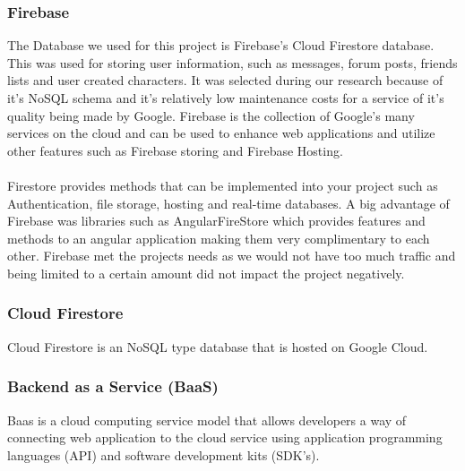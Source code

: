 \subsubsection{Firebase}
The Database we used for this project is Firebase's Cloud Firestore database. This was used for storing user information, such as messages, forum posts, friends lists and user created characters. It was selected during our research because of it's NoSQL schema and it's relatively low maintenance costs for a service of it's quality being made by Google. Firebase is the collection of Google's many services on the cloud and can be used to enhance web applications and utilize other features such as Firebase storing and Firebase Hosting. \\\\
Firestore provides methods that can be implemented into your project such as Authentication, file storage, hosting and real-time databases. A big advantage of Firebase was libraries such as AngularFireStore which provides features and methods to an angular application making them very complimentary to each other. Firebase met the projects needs as we would not have too much traffic and being limited to a certain amount did not impact the project negatively. \cite{firebase}

\subsubsection{Cloud Firestore}
Cloud Firestore is an NoSQL type database that is hosted on Google Cloud.

\subsubsection{Backend as a Service (BaaS)}
Baas is a cloud computing service model that allows developers a way of connecting web application to the cloud service using application programming languages (API) and software development kits (SDK's).

